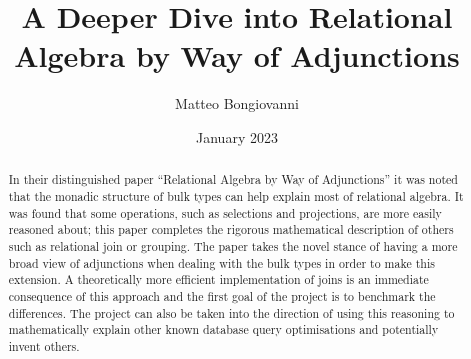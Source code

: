 \documentclass[a4paper, twoside]{report}
\title{A Deeper Dive into Relational Algebra by Way of Adjunctions}
\author{Matteo Bongiovanni}
\date{January 2023}
\begin{document}


\begin{abstract}
In their distinguished paper ``Relational Algebra by Way of Adjunctions''\cite{RelationalAlgebraByWayOfAdjunctions} it was noted that the monadic structure of bulk types can help explain most of relational algebra. It was found that some operations, such as selections and projections, are more easily reasoned about; this paper completes the rigorous mathematical description of others such as relational join or grouping. The paper takes the novel stance of having a more broad view of adjunctions when dealing with the bulk types in order to make this extension. A theoretically more efficient implementation of joins is an immediate consequence of this approach and the first goal of the project is to benchmark the differences. The project can also be taken into the direction of using this reasoning to mathematically explain other known database query optimisations and potentially invent others.
\end{abstract}

\begin{comment}
The aim of the project interim report is multi-fold:

  1. To provide a document that your second marker can use as a basis for discussion on your project plan and progress to date.
  2. To show that you have considered the ethical implications of your project.
  3. To provide a substantial body of text, primarily the project background and related work, that you can use in your final report. 

By the time the interim report is due you should have a clearly defined project, understand well the motivation and issues to be addressed, know the background work in detail, have the main ideas for how to tackle the problem and have started the development. You should also have a plan for the remainder of the project and, importantly, how to evaluate the project.

The interim report should contain the following sections. An approximate page count is suggested for each section, but there are no hard limits either way:


You are free to write up any additional material that will appear in the final report, for example a section or chapter describing a significant component of the design/implementation that you have already completed.  Avoid any additional material that is not re-usable in the final report.

As always, use diagrams and examples (e.g. code) wherever appropriate.

If you need inspiration, take a look at the Distinguished Projects from previous years, focusing in particular at this stage on the introduction, background and evaluation sections.
\end{comment}
\end{document}
